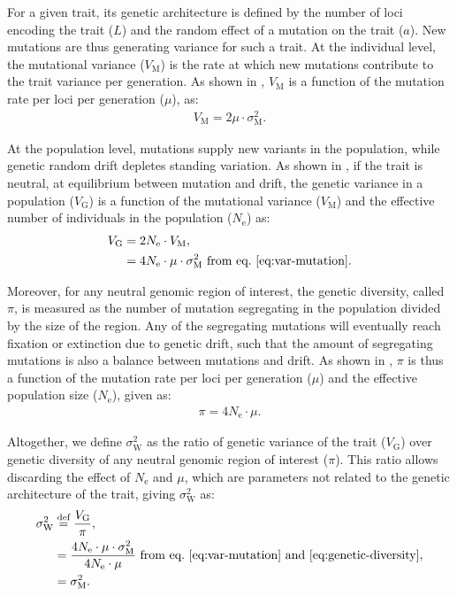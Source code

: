 \documentclass{article}
\newcommand{\defEqual}{\stackrel{\text{def}}{=}}
\newcommand{\Multiply}{\cdot}
\newcommand{\Ne}{N_{\text{e}}}
\newcommand{\MutationRate}{\mu}
\newcommand{\NbrLoci}{L}
\newcommand{\VarGenetic}{V_{\mathrm{G}}}
\newcommand{\VarMutation}{V_{\mathrm{M}}}
\newcommand{\RateMut}{\sigma^2_{\mathrm{M}}}
\newcommand{\RatePop}{\sigma^2_{\mathrm{W}}}
\begin{document}
For a given trait, its genetic architecture is defined by the number of loci encoding the trait ($\NbrLoci$) and the random effect of a mutation on the trait ($a$).
New mutations are thus generating variance for such a trait.
At the individual level, the mutational variance ($\VarMutation$) is the rate at which new mutations contribute to the trait variance per generation.
As shown in \textcite{lande_quantitative_1979, lande_sexual_1980}, $\VarMutation$ is a function of the mutation rate per loci per generation ($\MutationRate$), as:
\begin{gather}
    \VarMutation = 2 \MutationRate \Multiply \RateMut \label{eq:var-mutation}.
\end{gather}

At the population level, mutations supply new variants in the population, while genetic random drift depletes standing variation.
As shown in \textcite{lynch_mutation_1998}, if the trait is neutral, at equilibrium between mutation and drift, the genetic variance in a population ($\VarGenetic$) is a function of the mutational variance ($\VarMutation$) and the effective number of individuals in the population ($\Ne$) as:
\begin{align}
    \VarGenetic & =  2 \Ne \Multiply \VarMutation, \\
    & = 4 \Ne \Multiply \MutationRate \Multiply \RateMut \text{ from eq.~\ref{eq:var-mutation}}\label{eq:var-genetic}.
\end{align}

Moreover, for any neutral genomic region of interest, the genetic diversity, called $\pi$, is measured as the number of mutation segregating in the population divided by the size of the region.
Any of the segregating mutations will eventually reach fixation or extinction due to genetic drift, such that the amount of segregating mutations is also a balance between mutations and drift.
As shown in \textcite{tajima_statistical_1989}, $\pi$ is thus a function of the mutation rate per loci per generation ($\MutationRate$) and the effective population size ($\Ne$), given as:
\begin{gather}
    \pi = 4 \Ne \Multiply \MutationRate \label{eq:genetic-diversity}.
\end{gather}

Altogether, we define $\RatePop$ as the ratio of genetic variance of the trait ($\VarGenetic$) over genetic diversity of any neutral genomic region of interest ($\pi$).
This ratio allows discarding the effect of $\Ne$ and $\MutationRate$, which are parameters not related to the genetic architecture of the trait, giving $\RatePop$ as:
\begin{align}
    \RatePop & \defEqual \frac{\VarGenetic }{\pi}, \\
    & = \frac{4 \Ne \Multiply \MutationRate \Multiply \RateMut}{4 \Ne \Multiply \MutationRate} \text{ from eq.~\ref{eq:var-mutation} and~\ref{eq:genetic-diversity}}, \\
    & = \RateMut. \label{eq:rate-pop}
\end{align}
\end{document}
